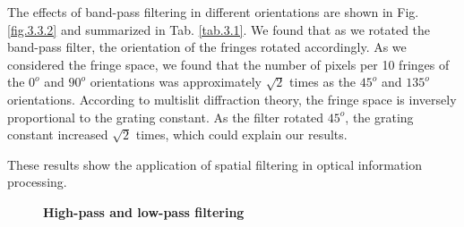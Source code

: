 \documentclass[10pt,a4paper,twocolumn,twoside,UTF8]{article}
\begin{document}
		The effects of band-pass filtering in different orientations are shown in Fig. \ref{fig.3.3.2} and summarized in Tab. \ref{tab.3.1}. 
		We found that as we rotated the band-pass filter, the orientation of the fringes rotated accordingly. 
		As we considered the fringe space, we found that the number of pixels per 10 fringes of the $0^{o}$ and $90^{o}$ orientations was approximately $\sqrt{2}$ times as the $45^{o}$ and $135^{o}$ orientations.
		According to multislit diffraction theory, the fringe space is inversely proportional to the grating constant. As the filter rotated $45^o$, the grating constant increased $\sqrt{2}$ times, which could explain our results. 

		These results show the application of spatial filtering in optical information processing.


		\begin{figure}[htbp]
			\centering

			\caption{\textbf{High-pass and low-pass filtering}}
		\end{figure}
\end{document}
